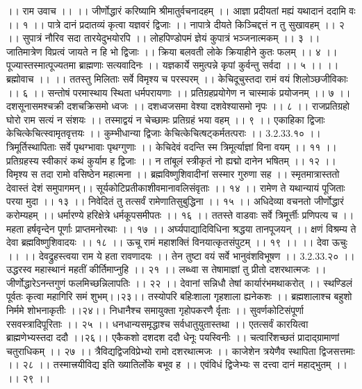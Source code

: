 ।। राम उवाच ।। ।।
जीर्णोद्धारं करिष्यामि श्रीमातुर्वचनादहम् ।।
आज्ञा प्रदीयतां मह्यं यथादानं ददामि वः ।। १ ।।
पात्रे दानं प्रदातव्यं कृत्वा यज्ञवरं द्विजाः ।।
नापात्रे दीयते किञ्चिद्दत्तं न तु सुखावहम् ।। २ ।।
सुपात्रं नौरिव सदा तारयेदुभयोरपि ।।
लोहपिण्डोपमं ज्ञेयं कुपात्रं भञ्जनात्मकम् ।। ३ ।।
जातिमात्रेण विप्रत्वं जायते न हि भो द्विजाः ।।
क्रिया बलवती लोके क्रियाहीने कुतः फलम् ।। ४ ।।
पूज्यास्तस्मात्पूज्यतमा ब्राह्मणाः सत्यवादिनः ।।
यज्ञकार्ये समुत्पन्ने कृपां कुर्वन्तु सर्वदा ।। ५ ।।
।। ब्रह्मोवाच ।। ।।
ततस्तु मिलिताः सर्वे विमृश्य च परस्परम् ।।
केचिदूचुस्तदा रामं वयं शिलोञ्छजीविकाः ।। ६ ।।
सन्तोषं परमास्थाय स्थिता धर्मपरायणाः ।।
प्रतिग्रहप्रयोगेण न चास्माकं प्रयोजनम् ।। ७ ।।
दशसूनासमश्चक्री दशचक्रिसमो ध्वजः ।।
दशध्वजसमा वेश्या दशवेश्यासमो नृपः ।। ८ ।।
राजप्रतिग्रहो घोरो राम सत्यं न संशयः ।।
तस्माद्वयं न चेच्छामः प्रतिग्रहं भया वहम् ।। ९ ।।
एकाहिका द्विजाः केचित्केचित्स्वामृतवृत्तयः ।।
कुम्भीधान्या द्विजाः केचित्केचित्षट्कर्मतत्पराः ।। 3.2.33.१० ।।
त्रिमूर्तिस्थापिताः सर्वे पृथग्भावाः पृथग्गुणाः ।।
केचिदेवं वदन्ति स्म त्रिमूर्त्याज्ञां विना वयम् ।। ११ ।।
प्रतिग्रहस्य स्वीकारं कथं कुर्याम ह द्विजाः ।।
न तांबूलं स्त्रीकृतं नो ह्यद्मो दानेन भषितम् ।। १२ ।।
विमृश्य स तदा रामो वसिष्ठेन महात्मना ।।
ब्रह्मविष्णुशिवादीनां सस्मार गुरुणा सह ।।
स्मृतमात्रास्ततो देवास्तं देशं समुपागमन्।।
सूर्यकोटिप्रतीकाशीवमानावलिसंवृताः ।। १४ ।।
रामेण ते यथान्यायं पूजिताः परया मुदा ।। १३ ।।
निवेदितं तु तत्सर्वं रामेणातिसुबुद्धिना ।। १५ ।।
अधिदेव्या वचनतो जीर्णोद्धारं करोम्यहम् ।।
धर्मारण्ये हरिक्षेत्रे धर्मकूपसमीपतः ।। १६ ।।
ततस्ते वाडवाः सर्वे त्रिमूर्त्तीः प्रणिपत्य च ।।
महता हर्षवृन्देन पूर्णाः प्राप्तमनोरथाः ।। १७ ।।
अर्घ्यपाद्यादिविधिना श्रद्धया तानपूजयन् ।।
क्षणं विश्रम्य ते देवा ब्रह्मविष्णुशिवादयः ।। १८ ।।
ऊचू रामं महाशक्तिं विनयात्कृतसंपुटम् ।। १९ ।।
।। देवा ऊचुः ।। ।।
देवद्रुहस्त्वया राम ये हता रावणादयः ।।
तेन तुष्टा वयं सर्वे भानुवंशविभूषण ।। 3.2.33.२० ।।
उद्धरस्व महास्थानं महतीं कीर्तिमाप्नुहि ।। २१ ।।
लब्ध्वा स तेषामाज्ञां तु प्रीतो दशरथात्मजः ।।
जीर्णोद्धारेऽनन्तगुणं फलमिच्छन्निलापतिः ।। २२ ।।
देवानां सन्निधौ तेषां कार्यारंभमथाकरोत् ।।
स्थण्डिलं पूर्वतः कृत्वा महागिरि समं शुभम्।।२३।।
तस्योपरि बहिःशाला गृहशाला ह्यनेकशः ।।
ब्रह्मशालाश्च बहुशो निर्ममे शोभनाकृतीः ।।२४।।
निधानैश्च समायुक्ता गृहोपकरणै र्वृताः ।।
सुवर्णकोटिसंपूर्णा रसवस्त्रादिपूरिताः ।। २५ ।।
धनधान्यसमृद्धाश्च सर्वधातुयुतास्तथा ।।
एतत्सर्वं कारयित्वा ब्राह्मणेभ्यस्तदा ददौ ।।२६।।
एकैकशो दशदश ददौ धेनूः पयस्विनीः ।।
चत्वारिंशच्छतं प्रादाद्ग्रामाणां चतुराधिकम् ।। २७ ।।
त्रैविद्यद्विजविप्रेभ्यो रामो दशरथात्मजः ।।
काजेशेन त्रयेणैव स्थापिता द्विजसत्तमाः ।। २८ ।।
तस्मात्त्रयीविद्य इति ख्यातिर्लोके बभूव ह ।।
एवंविधं द्विजेभ्यः स दत्त्वा दानं महाद्भुतम् ।। ।। २९ ।।
